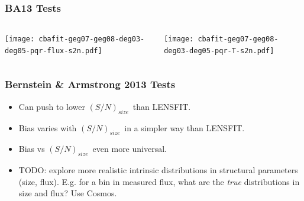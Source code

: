 \documentclass{beamer}
\newcommand{\snT}{$(S/N)_{size}$}
\begin{document}
\frame
{
    \frametitle{BA13 Tests}

    \begin{columns}
        
        \begin{column}{0.5\textwidth}
            \texttt{[image: cbafit-geg07-geg08-deg03-deg05-pqr-flux-s2n.pdf]}
        \end{column}

        \begin{column}{0.5\textwidth}
            \texttt{[image: cbafit-geg07-geg08-deg03-deg05-pqr-T-s2n.pdf]}
        \end{column}
    \end{columns}
}

\frame
{
    
    \frametitle{Bernstein \& Armstrong 2013 Tests}

    \begin{itemize}
        \item Can push to lower \snT\ than LENSFIT.
        \item Bias varies with \snT\ in a simpler way than LENSFIT.
        \item Bias vs \snT\ even more universal.
        \item TODO: explore more realistic intrinsic distributions in structural
            parameters (size, flux).  E.g. for a bin in measured flux, what are
            the {\it true} distributions in size and flux?  Use Cosmos.
    \end{itemize}
}
\end{document}
